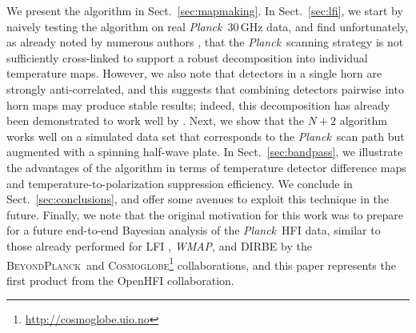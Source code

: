 \documentclass{aa}
\newcommand{\bp}{\textsc{BeyondPlanck}}
\newcommand{\Cosmoglobe}{\textsc{Cosmoglobe}}
\def\Cosmoglobe{\textsc{Cosmoglobe}}
\def\Planck{\textit{Planck}}
\def\WMAP{\textit{WMAP}}
\begin{document}
We present the algorithm in Sect.~\ref{sec:mapmaking}. In Sect.~\ref{sec:lfi}, we start by naively testing the algorithm on real \Planck\ 30\,GHz data, and find unfortunately, as already noted by numerous authors \citep[e.g.,][]{planckScan}, that the \Planck\ scanning strategy is not sufficiently cross-linked to support a robust decomposition into individual temperature maps. However, we also note that detectors in a single horn are strongly anti-correlated, and this suggests that combining detectors pairwise into horn maps may produce stable results; indeed, this decomposition has already been demonstrated to work well by \citet{npipe}. Next, we show that the $N+2$ algorithm works well on a simulated data set that corresponds to the \Planck\ scan path but augmented with a spinning half-wave plate. In Sect.~\ref{sec:bandpass}, we illustrate the advantages of the algorithm in terms of temperature detector difference maps and temperature-to-polarization suppression efficiency. We conclude in Sect.~\ref{sec:conclusions}, and offer some avenues to exploit this technique in the future. Finally, we note that the original motivation for this work was to prepare for a future end-to-end Bayesian analysis of the \Planck\ HFI data, similar to those already performed for LFI \citep{bp01}, \WMAP \citep{watts2023_dr1}, and DIRBE \citep{CG02_01} by the \bp\ and \Cosmoglobe\footnote{\url{http://cosmoglobe.uio.no}} collaborations, and this paper represents the first product from the OpenHFI collaboration.  
\end{document}
